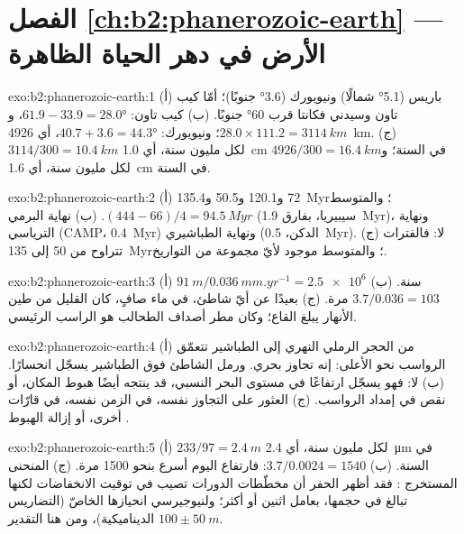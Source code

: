\section*{الفصل \ref{ch:b2:phanerozoic-earth} --- الأرض في دهر الحياة الظاهرة}

\begin{solution}{exo:b2:phanerozoic-earth:1}
(أ) باريس (\ang{5.1} شمالًا) ونيويورك (\ang{3.6} جنوبًا)؛ أمّا كيب تاون وسيدني فكانتا قرب \ang{60} جنوبًا.
(ب) كيب تاون: $61.9 - 33.9 = \ang{28.0}$، و$28.0 \times 111.2 = \qty{3114}{km}$؛ ونيويورك:
$40.7 + 3.6 = \ang{44.3}$، أي \qty{4926}{km}. (ج) $3114/300 = \qty{10.4}{km}$ لكل مليون سنة،
أي \qty{1.0}{cm} في السنة؛ و$4926/300 = \qty{16.4}{km}$ لكل مليون سنة، أي \qty{1.6}{cm} في السنة.
\end{solution}

\begin{solution}{exo:b2:phanerozoic-earth:2}
(أ) 72 و120.1 و50.5 و\qty{135.4}{Myr}؛ والمتوسط $(444 - 66)/4 = \qty{94.5}{Myr}$. (ب) نهاية
البرمي (سيبيريا، بفارق \qty{1.9}{Myr})، ونهاية الترياسي (CAMP، \qty{0.4}{Myr}) ونهاية
الطباشيري (الدكن، \qty{0.5}{Myr}). (ج) لا: فالفترات تتراوح من 50 إلى
\qty{135}{Myr}؛ والمتوسط موجود لأيّ مجموعة من التواريخ.
\end{solution}

\begin{solution}{exo:b2:phanerozoic-earth:3}
(أ) $\qty{91}{m}/\qty{0.036}{mm.yr^{-1}} = \num{2.5e6}$ سنة. (ب) $3.7/0.036 = 103$ مرة. (ج)
بعيدًا عن أيّ شاطئ، في ماء صافٍ، كان القليل من طين الأنهار يبلغ القاع؛ وكان مطر
أصداف الطحالب هو الراسب الرئيسي.
\end{solution}

\begin{solution}{exo:b2:phanerozoic-earth:4}
(أ) من الحجر الرملي النهري إلى الطباشير تتعمّق الرواسب نحو الأعلى: إنه تجاوز بحري.
ورمل الشاطئ فوق الطباشير يسجّل انحسارًا. (ب) لا: فهو يسجّل ارتفاعًا في مستوى البحر النسبي،
قد ينتجه أيضًا هبوط المكان، أو نقص في إمداد الرواسب. (ج)
العثور على التجاوز نفسه، في الزمن نفسه، في قارّات أخرى، أو إزالة
الهبوط .
\end{solution}

\begin{solution}{exo:b2:phanerozoic-earth:5}
(أ) $233/97 = \qty{2.4}{m}$ لكل مليون سنة، أي \qty{2.4}{\micro m} في السنة. (ب) $3.7/0.0024 =
1540$: فارتفاع اليوم أسرع بنحو 1500 مرة. (ج) المنحنى المستخرج : فقد أظهر الحفر
أن مخطّطات الدورات تصيب في توقيت الانخفاضات لكنها تبالغ في حجمها، بعامل اثنين أو
أكثر؛ ولنيوجيرسي انحيازها الخاصّ (التضاريس الديناميكية)، ومن هنا التقدير $100 \pm
\qty{50}{m}$.
\end{solution}

